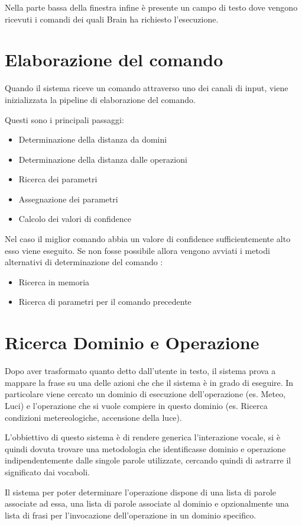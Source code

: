 \documentclass[twoside]{supsistudent}
\begin{document}
Nella parte bassa della finestra infine è presente un campo di testo dove vengono ricevuti i comandi dei quali Brain ha richiesto l'esecuzione.
\chapter{Elaborazione del comando}
Quando il sistema riceve un comando attraverso uno dei canali di input, viene inizializzata la pipeline di elaborazione del comando.

Questi sono i principali passaggi: 
\begin{itemize}
	\item Determinazione della distanza da domini
	\item Determinazione della distanza dalle operazioni
	\item Ricerca dei parametri
	\item Assegnazione dei parametri
	\item Calcolo dei valori di confidence
\end{itemize}
Nel caso il miglior comando abbia un valore di confidence sufficientemente alto esso viene eseguito. Se non fosse possibile allora vengono avviati i metodi alternativi di determinazione del comando :
\begin{itemize}
	\item Ricerca in memoria
	\item Ricerca di parametri per il comando precedente
\end{itemize}

\chapter{Ricerca Dominio e Operazione}
Dopo aver trasformato quanto detto dall'utente in testo, il sistema prova a mappare la frase su una delle azioni che che il sistema è in grado di eseguire.
In particolare viene cercato un dominio di esecuzione dell'operazione (es. Meteo, Luci) e l'operazione che si vuole compiere in questo dominio (es. Ricerca condizioni metereologiche, accensione della luce).


L'obbiettivo di questo sistema è di rendere generica l'interazione vocale, si è quindi dovuta trovare una metodologia che identificasse dominio e operazione indipendentemente dalle singole parole utilizzate, cercando quindi di astrarre il significato dai vocaboli.

 Il sistema per poter determinare l'operazione dispone di una lista di parole associate ad essa, una lista di parole associate al dominio e opzionalmente una lista di frasi per l'invocazione dell'operazione in un dominio specifico.
\end{document}
